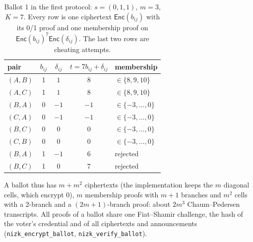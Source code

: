 \documentclass[11pt,a4paper]{article}
\newcommand{\Enc}{\mathsf{Enc}}
\newcommand{\rocq}[1]{\texttt{#1}}
\theoremstyle{remark}
\begin{document}
\begin{table}[t]
  \centering
  \caption{Ballot 1 in the first protocol: $s = (0,1,1)$, $m = 3$, $K =
  7$. Every row is one ciphertext $\Enc(b_{ij})$ with its 0/1 proof and
  one membership proof on $\Enc(b_{ij})^7 \Enc(\delta_{ij})$. The last two
  rows are cheating attempts.}
  \label{tab:ballot1}
  \begin{tabular}{@{}lcccl@{}}
    \toprule
    pair & $b_{ij}$ & $\delta_{ij}$ & $t = 7 b_{ij} + \delta_{ij}$ & membership \\
    \midrule
    $(A,B)$ & 1 & $1$ & $8$ & $\in \{8,9,10\}$ \\
    $(A,C)$ & 1 & $1$ & $8$ & $\in \{8,9,10\}$ \\
    $(B,A)$ & 0 & $-1$ & $-1$ & $\in \{-3,\ldots,0\}$ \\
    $(C,A)$ & 0 & $-1$ & $-1$ & $\in \{-3,\ldots,0\}$ \\
    $(B,C)$ & 0 & $0$ & $0$ & $\in \{-3,\ldots,0\}$ \\
    $(C,B)$ & 0 & $0$ & $0$ & $\in \{-3,\ldots,0\}$ \\
    \midrule
    $(B,A)$ & 1 & $-1$ & $6$ & rejected \\
    $(B,C)$ & 1 & $0$ & $7$ & rejected \\
    \bottomrule
  \end{tabular}
\end{table}

A ballot thus has $m + m^2$ ciphertexts (the implementation keeps the $m$
diagonal cells, which encrypt $0$), $m$ membership proofs with $m+1$
branches and $m^2$ cells with a 2-branch and a $(2m+1)$-branch proof: about
$2m^3$ Chaum--Pedersen transcripts. All proofs of a ballot share one
Fiat--Shamir challenge, the hash of the voter's credential and of all
ciphertexts and announcements (\rocq{nizk\_encrypt\_ballot},
\rocq{nizk\_verify\_ballot}).
\end{document}
